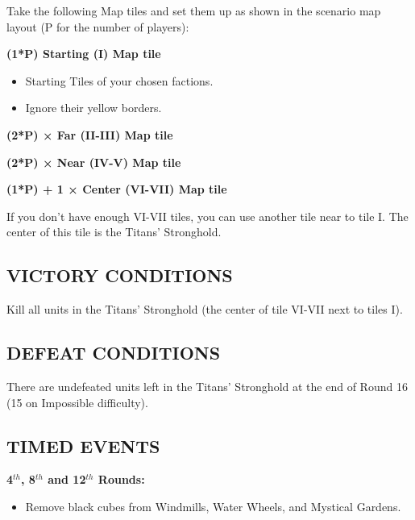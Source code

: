 \begin{multicols*}{2}
Take the following Map tiles and set them up as shown in the scenario map layout (P for the number of players):

\textbf{(1*P) Starting (I) Map tile}
\begin{itemize}
  \item Starting Tiles of your chosen factions.
  \item Ignore their yellow borders.
\end{itemize}

\textbf{(2*P) × Far (II-III) Map tile}

\textbf{(2*P) × Near (IV-V) Map tile}

\textbf{(1*P) + 1 × Center (VI-VII) Map tile}

If you don't have enough VI-VII tiles, you can use another tile near to tile I.
The center of this tile is the Titans' Stronghold.

\subsection*{\MakeUppercase{Victory Conditions}}

Kill all units in the Titans' Stronghold (the center of tile VI-VII next to tiles I).

\subsection*{\MakeUppercase{Defeat Conditions}}

There are undefeated units left in the Titans' Stronghold at the end of Round 16 (15 on Impossible difficulty).

\subsection*{\MakeUppercase{Timed Events}}

\textbf{4$^{th}$, 8$^{th}$ and 12$^{th}$ Rounds:}
\begin{itemize}
  \item Remove black cubes from Windmills, Water Wheels, and Mystical Gardens.
\end{itemize}


\end{multicols*}
